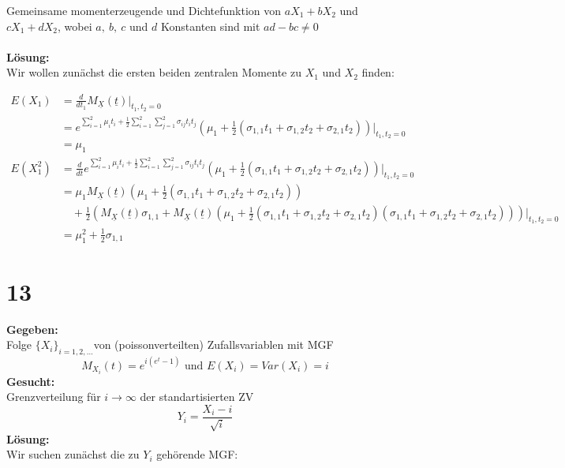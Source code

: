 \documentclass{article}
\begin{document}
Gemeinsame momenterzeugende und Dichtefunktion von $aX_1 + bX_2$ und $cX_1 + dX_2$, wobei $a,~ b, ~c$ und $d$ Konstanten sind mit $ad - bc \neq 0$   \\ \\
\textbf{Lösung:}\\

Wir wollen zunächst die ersten beiden zentralen Momente zu $X_1$ und $X_2$ finden:

\begin{align*}
        E(X_1) &= \frac{d}{dt_1} M_{\underline{X}}(\underline{t})\bigg|_{t_1, t_2 = 0} \\
        &= e^{\sum_{i = 1}^{2}\mu_i t_i + \frac{1}{2}\sum_{i = 1}^{2}\sum_{j = 1}^{2}\sigma_{ij}t_it_j}(\mu_1 + \frac{1}{2}(\sigma_{1,1}t_1 + \sigma_{1, 2} t_2 + \sigma_{2, 1} t_2))\bigg|_{t_1, t_2 = 0} \\
        &= \mu_1 \\
        E(X_1^2) &= \frac{d}{dt}  e^{\sum_{i = 1}^{2}\mu_i t_i + \frac{1}{2}\sum_{i = 1}^{2}\sum_{j = 1}^{2}\sigma_{ij}t_it_j}(\mu_1 + \frac{1}{2}(\sigma_{1,1}t_1 + \sigma_{1, 2} t_2 + \sigma_{2, 1} t_2))\bigg|_{t_1, t_2 = 0} \\
        &= \mu_1 M_{\underline{X}}(\underline{t})(\mu_1 + \frac{1}{2}(\sigma_{1,1}t_1 + \sigma_{1, 2} t_2 + \sigma_{2, 1} t_2))  \\
        &\quad + \frac{1}{2}(M_{\underline{X}}(\underline{t})\sigma_{1,1} + M_{\underline{X}}(\underline{t}) (\mu_1 + \frac{1}{2}(\sigma_{1,1}t_1 + \sigma_{1, 2} t_2 + \sigma_{2, 1} t_2)(\sigma_{1,1}t_1 + \sigma_{1, 2} t_2 + \sigma_{2, 1} t_2))) \bigg|_{t_1, t_2 = 0} \\
        &= \mu_1^2 + \frac{1}{2}\sigma_{1,1}
\end{align*}

\section*{13}
\textbf{Gegeben:}\\

Folge $\{X_i\}_{i = 1,2,\ldots}$von (poissonverteilten) Zufallsvariablen  mit MGF 
\[M_{X_i}(t) = e^{i(e^t-1)}\text{ und } E(X_i) = Var(X_i) = i\]
\textbf{Gesucht:}\\

Grenzverteilung für $i \rightarrow \infty$ der standartisierten ZV
\[Y_i = \frac{X_i - i}{\sqrt{i}}\]
\textbf{Lösung:}\\

Wir suchen zunächst die zu $Y_i$ gehörende MGF:
\end{document}
